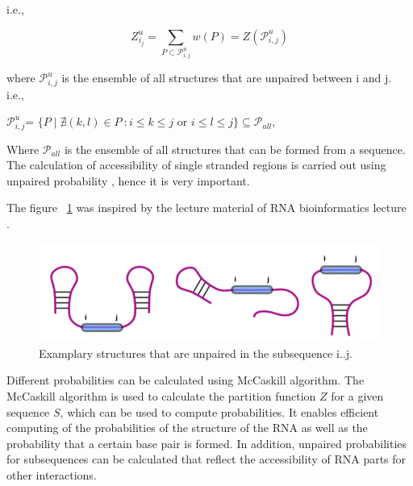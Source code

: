 \documentclass[twoside,a4paper]{report}
\begin{document}
 	 i.e., 
 	 \begin{center}	 
 	 	\[ 
 	 	Z^u_{i_j}= \sum_{P \subset \mathcal{P}_{i,j}^{u}} w(P) = Z(\mathcal{P}_{i,j}^{u})
 	 	\]
 	 \end{center}
  
  	 where $\mathcal{P}_{i,j}^{u}$ is the ensemble of all structures that are unpaired between i and j.\\
  	 
  	  i.e., 
  	 \begin{center}	 
  	 
  	 	$\mathcal{P}^u_{i,j}$= $\{P \mid \nexists (k,l) \in P\ : i \leq k \leq j $ or $ i \leq l \leq j\}\subseteq \mathcal {P}_{all}$,
  	 
  	 \end{center}
  	 
  	 Where $\mathcal {P}_{all}$ is the ensemble of all structures that can be formed from a sequence. The calculation of accessibility of single stranded regions is carried out using  unpaired probability \citep{muckstein2006thermodynamics}, hence it is very important. 
  
 	 The figure ~\ref{fig:unpaired} was inspired by the lecture material of RNA bioinformatics lecture .\\
 	 
 	 \begin{figure}[tb]
 	 	\includegraphics[width=0.8\linewidth]{unpaired}
 	 	\centering
 	 	\caption{Examplary structures that are unpaired in the subsequence i..j.}
 	 	\label{fig:unpaired}
 	 \end{figure}
  
 	 Different probabilities can be calculated using McCaskill algorithm. The McCaskill algorithm \citep{mccaskill1990equilibrium} is used to calculate the partition function $Z$ for a given sequence $S$, which can be used to compute probabilities. It enables efficient computing of the probabilities of the structure of the RNA as well as the probability that a certain base pair is formed. In addition, unpaired probabilities for subsequences can be calculated that reflect the accessibility of RNA parts for other interactions.\\ 
 	
\end{document}
